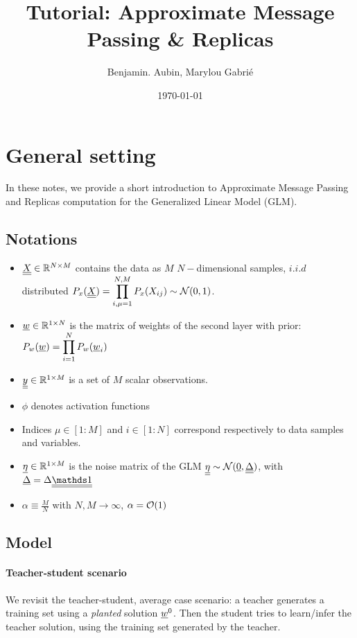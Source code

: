 \documentclass[aip,jmp,amsmath,amssymb,reprint]{revtex4}
\begin{document}
\title{\huge Tutorial: Approximate Message Passing \& Replicas}
\author{Benjamin. Aubin, Marylou Gabrié}
\date{\today}
\maketitle

\tableofcontents
\newpage



\section{\Large General setting}
 In these notes, we provide a short introduction to Approximate Message Passing and Replicas computation for the Generalized Linear Model (GLM). \\
  
\subsection{Notations}
\begin{itemize}
	\item $\underline{\underline{X}} \in \mathbb{R}^{N \times M}$ contains the data as $M$ $N-$dimensional samples, $i.i.d$ distributed  $P_x(\underline{\underline{X}}) = \displaystyle \prod_{i,\mu=1}^{N,M} P_x(X_{ij})\sim \mathcal{N}(0,1)$.
	\item ${\underline{w}}\in \mathbb{R}^{1 \times N}$ is the matrix of weights of the second layer with prior: $P_w({\underline{w}})= \displaystyle \prod_{i=1}^N P_w({\underline{w}}_i)$
	\item $\underline{\underline{y}} \in \mathbb{R}^{1 \times M}$ is a set of $M$ scalar observations.
	\item $\phi$ denotes activation functions
	\item Indices $\mu \in [1:M]$ and $i\in[1:N]$ correspond respectively to data samples and variables.
	\item ${\underline{\eta}} \in \mathbb{R}^{1 \times M} $ is the noise matrix of the GLM $\underline{\underline{\eta}} \sim \mathcal{N}({\underline{0}},\underline{\underline{\Delta}})$, with $\ud{\Delta} = \Delta \du{\id}$ 
	\item $\alpha \equiv \frac{M}{N}$ with $N, M \to \infty$, $\alpha= \mathcal{O}(1)$
\end{itemize}


\subsection{Model}
\paragraph{Teacher-student scenario}
We revisit the teacher-student, average case scenario: a teacher generates a training set using a \textit{planted} solution ${\underline{w}}^0$. Then the student tries to learn/infer the teacher solution, using the training set generated by the teacher.
\end{document}
